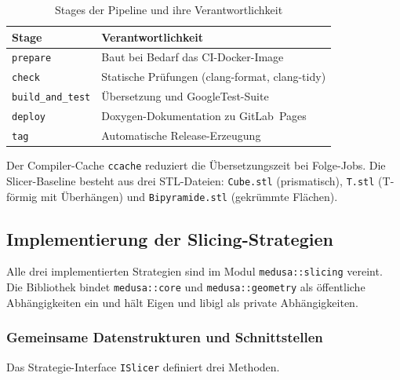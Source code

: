                 \begin{table}[ht]
                    \centering
                    \caption[Stages der GitLab-CI-Pipeline]{%
                        Stages der Pipeline und ihre Verantwortlichkeit%
                    }
                    \label{tab:impl-medusa-ci-stages}
                    \renewcommand{\arraystretch}{1.2}
                    \begin{tabular}{@{} l p{8.0cm} @{}}
                        \toprule
                        \textbf{Stage} & \textbf{Verantwortlichkeit} \\
                        \midrule
                        \texttt{prepare}        & Baut bei Bedarf das CI-Docker-Image \\
                        \texttt{check}          & Statische Prüfungen (clang-format, clang-tidy) \\
                        \texttt{build\_and\_test} & Übersetzung und GoogleTest-Suite \\
                        \texttt{deploy}         & Doxygen-Dokumentation zu GitLab~Pages \\
                        \texttt{tag}            & Automatische Release-Erzeugung \\
                        \bottomrule
                    \end{tabular}
                \end{table}

                Der Compiler-Cache \texttt{ccache} reduziert die Übersetzungszeit bei Folge-Jobs.
                Die Slicer-Baseline besteht aus drei STL-Dateien: \texttt{Cube.stl} (prismatisch), \texttt{T.stl} (T-förmig mit Überhängen) und \texttt{Bipyramide.stl} (gekrümmte Flächen).

        \subsection{Implementierung der Slicing-Strategien}\label{subsec:impl-medusa-slicing-strategies}
            Alle drei implementierten Strategien sind im Modul \texttt{medusa::slicing} vereint.
            Die Bibliothek bindet \texttt{medusa::core} und \texttt{medusa::geometry} als öffentliche Abhängigkeiten ein und hält Eigen und libigl als private Abhängigkeiten.

            \subsubsection{Gemeinsame Datenstrukturen und Schnittstellen}\label{subsubsec:impl-medusa-slicing-common}
                Das Strategie-Interface \texttt{ISlicer} definiert drei Methoden.

